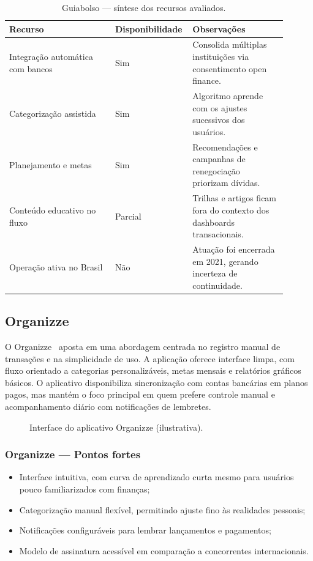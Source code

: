 \begin{table}[H]
\centering
\caption{Guiabolso — síntese dos recursos avaliados.}
\label{tab:guiabolso_comparativo}
\begin{tabular}{p{0.37\linewidth}p{0.2\linewidth}p{0.33\linewidth}}
\hline
\textbf{Recurso} & \textbf{Disponibilidade} & \textbf{Observações} \\
\hline
Integração automática com bancos & Sim & Consolida múltiplas instituições via consentimento open finance. \\
Categorização assistida & Sim & Algoritmo aprende com os ajustes sucessivos dos usuários. \\
Planejamento e metas & Sim & Recomendações e campanhas de renegociação priorizam dívidas. \\
Conteúdo educativo no fluxo & Parcial & Trilhas e artigos ficam fora do contexto dos dashboards transacionais. \\
Operação ativa no Brasil & Não & Atuação foi encerrada em 2021, gerando incerteza de continuidade. \\
\hline
\end{tabular}
\end{table}

\subsection{Organizze}\label{subsec:organizze}

O Organizze~\cite{ORGANIZZE2025} aposta em uma abordagem centrada no registro manual de transações e na simplicidade de uso. A aplicação oferece interface limpa, com fluxo orientado a categorias personalizáveis, metas mensais e relatórios gráficos básicos. O aplicativo disponibiliza sincronização com contas bancárias em planos pagos, mas mantém o foco principal em quem prefere controle manual e acompanhamento diário com notificações de lembretes.

\begin{figure}[H]
\centering
{}
\caption{Interface do aplicativo Organizze (ilustrativa).}
\label{fig:organizze}
\end{figure}

\subsubsection*{Organizze — Pontos fortes}
\begin{itemize}
    \item Interface intuitiva, com curva de aprendizado curta mesmo para usuários pouco familiarizados com finanças;
    \item Categorização manual flexível, permitindo ajuste fino às realidades pessoais;
    \item Notificações configuráveis para lembrar lançamentos e pagamentos;
    \item Modelo de assinatura acessível em comparação a concorrentes internacionais.
\end{itemize}

